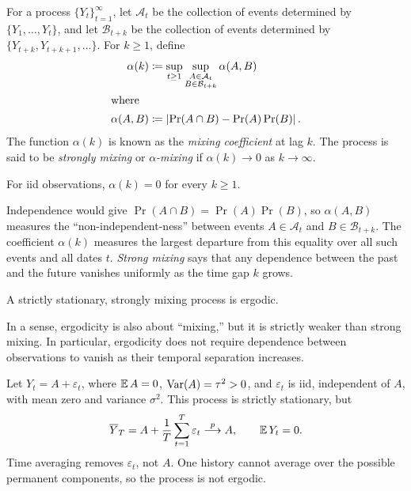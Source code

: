 \documentclass[a4paper,12pt]{article}
\begin{document}
\begin{definition}
	For a process $\{Y_t\}_{t=1}^{\infty}$,
	let $\mathcal A_t$ be the collection of events
	determined by $\{Y_1,\ldots,Y_t\}$, and let $\mathcal B_{t+k}$ be the collection of events
	determined by $\{Y_{t+k},Y_{t+k+1},\ldots\}$.
	For $k\ge1$, define
	\begin{align}
		\alpha(k)&\coloneqq\sup_{t\ge1}\sup_{\substack{A\in\mathcal A_t\\B\in\mathcal B_{t+k}}}\alpha(A,B) \\
		\shortintertext{where}
		\alpha(A,B)&\coloneqq \left|\Pr(A\cap B)-\Pr(A)\Pr(B)\right|.
	\end{align}
	The function $\alpha(k)$ is known as the \emph{mixing coefficient} at lag $k$.
	The process is said to be \emph{strongly mixing} or \emph{$\alpha$-mixing} if $\alpha(k)\to0$ as $k\to\infty$.
\end{definition}

\begin{remark}
	For \gls{iid} observations, $\alpha(k)=0$ for every $k\ge1$.
\end{remark}

\begin{remark}
	Independence would give $\Pr(A\cap B)=\Pr(A)\Pr(B)$,
	so $\alpha(A,B)$ measures the
	``non-independent-ness'' between events $A\in\mathcal{A}_t$ and $B\in\mathcal{B}_{t+k}$.
	The coefficient $\alpha(k)$ measures the largest departure from this equality
	over all such events and all dates $t$.
	\emph{Strong mixing} says that any dependence between the past and the future vanishes uniformly as the time gap $k$ grows.
\end{remark}

\begin{proposition}
	A strictly stationary, strongly mixing process is ergodic.
\end{proposition}

\begin{remark}
	In a sense, ergodicity is also about ``mixing,'' but it is strictly weaker than strong mixing.
	In particular, ergodicity does not require dependence between observations to vanish as their temporal separation increases.
\end{remark}

\begin{example}\label{ex-permanent-component}
	Let $Y_t=A+\varepsilon_t$, where $\E A=0$, $\Var(A)=\tau^2>0$,
	and $\varepsilon_t$ is \gls{iid}, independent of $A$, with mean zero and variance $\sigma^2$.
	This process is strictly stationary, but
	\begin{align}
		\overline Y_T=A+\frac1T\sum_{t=1}^T\varepsilon_t\pto A,\qquad \E Y_t=0.
	\end{align}
	Time averaging removes $\varepsilon_t$, not $A$.
	One history cannot average over the possible permanent components, so the process is not ergodic.
\end{example}
\end{document}
